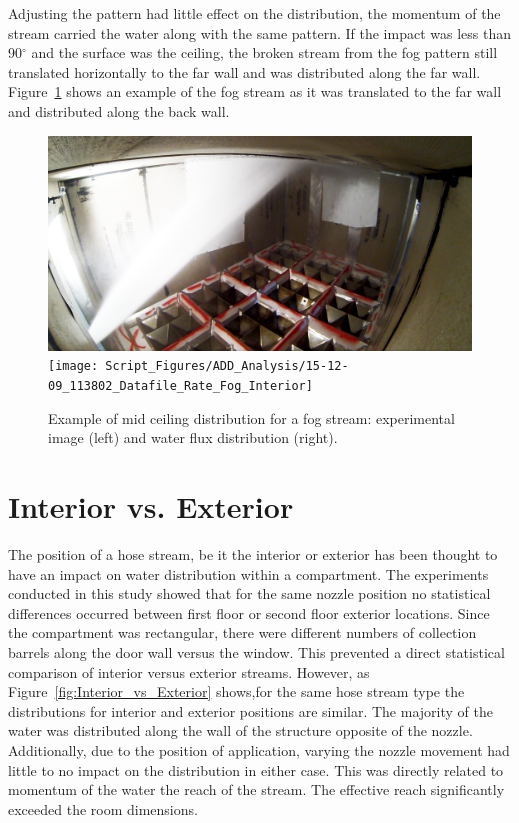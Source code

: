 \documentclass[12pt,oneside]{book}
\begin{document}
Adjusting the pattern had little effect on the distribution, the momentum of the stream carried the water along with the same pattern. If the impact was less than 90$^{\circ}$ and the surface was the ceiling, the broken stream from the fog pattern still translated horizontally to the far wall and was distributed along the far wall. Figure~\ref{fig:Interior_Fog_MidCeiling} shows an example of the fog stream as it was translated to the far wall and distributed along the back wall.

\begin{figure}[!ht]
\centering
\includegraphics[height=0.25\textwidth]{Figures/Water_Distribution/Nozzle_Directions/Interior_MidCeiling_Fog}
\texttt{[image: Script\_Figures/ADD\_Analysis/15-12-09\_113802\_Datafile\_Rate\_Fog\_Interior]}
\caption[Example of Mid Ceiling Distribution]{Example of mid ceiling distribution for a fog stream: experimental image (left) and water flux distribution (right).}
\label{fig:Interior_Fog_MidCeiling}
\end{figure}

\section{Interior vs. Exterior}
The position of a hose stream, be it the interior or exterior has been thought to have an impact on water distribution within a compartment. The experiments conducted in this study showed that for the same nozzle position no statistical differences occurred between first floor or second floor exterior locations. Since the compartment was rectangular, there were different numbers of collection barrels along the door wall versus the window. This prevented a direct statistical comparison of interior versus exterior streams. However, as Figure~\ref{fig:Interior_vs_Exterior} shows,for the same hose stream type the distributions for interior and exterior positions are similar. The majority of the water was distributed along the wall of the structure opposite of the nozzle. Additionally, due to the position of application, varying the nozzle movement had little to no impact on the distribution in either case. This was directly related to momentum of the water the reach of the stream. The effective reach significantly exceeded the room dimensions.
\end{document}
